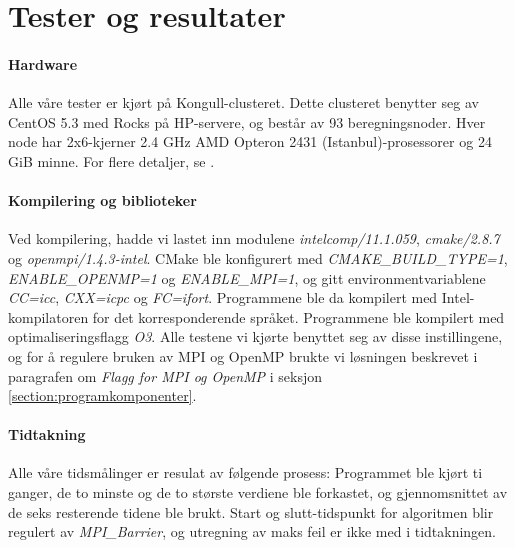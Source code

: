 \documentclass{article}
\begin{document}
\section{Tester og resultater}

\paragraph{Hardware}
Alle våre tester er kjørt på Kongull-clusteret. Dette clusteret benytter seg av CentOS 5.3 med Rocks på HP-servere, og består av 93 beregningsnoder. Hver node har 2x6-kjerner 2.4 GHz AMD Opteron 2431 (Istanbul)-prosessorer og 24 GiB minne. For flere detaljer, se \cite{kongull-hardware}.  

\paragraph{Kompilering og biblioteker}
Ved kompilering, hadde vi lastet inn modulene \emph{intelcomp/11.1.059}, \emph{cmake/2.8.7} og \emph{openmpi/1.4.3-intel}. CMake ble konfigurert med \emph{CMAKE\_BUILD\_TYPE=1}, \emph{ENABLE\_OPENMP=1} og \emph{ENABLE\_MPI=1}, og gitt environmentvariablene \emph{CC=icc}, \emph{CXX=icpc} og \emph{FC=ifort}. Programmene ble da kompilert med Intel-kompilatoren for det korresponderende språket. Programmene ble kompilert med optimaliseringsflagg \emph{O3}. Alle testene vi kjørte benyttet seg av disse instillingene, og for å regulere bruken av MPI og OpenMP brukte vi løsningen beskrevet i paragrafen om \emph{Flagg for MPI og OpenMP} i seksjon \ref{section:programkomponenter}.

\paragraph{Tidtakning}
Alle våre tidsmålinger er resulat av følgende prosess: Programmet ble kjørt ti ganger, de to minste og de to største verdiene ble forkastet, og gjennomsnittet av de seks resterende tidene ble brukt. Start og slutt-tidspunkt for algoritmen blir regulert av \emph{MPI\_Barrier}, og utregning av maks feil er ikke med i tidtakningen.
\end{document}
